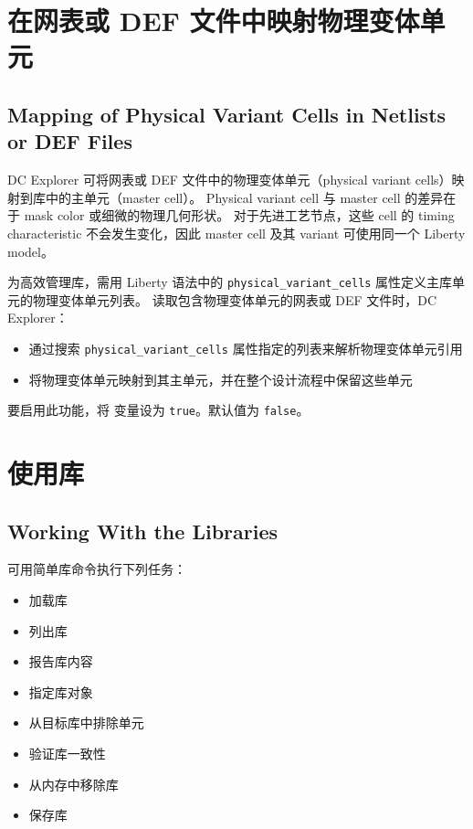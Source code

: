 \section{在网表或 DEF 文件中映射物理变体单元}
\subsection*{Mapping of Physical Variant Cells in Netlists or DEF Files}

DC Explorer 可将网表或 DEF 文件中的物理变体单元（physical variant cells）映射到库中的主单元（master cell）。
Physical variant cell 与 master cell 的差异在于 mask color 或细微的物理几何形状。
对于先进工艺节点，这些 cell 的 timing characteristic 不会发生变化，因此 master cell 及其 variant 可使用同一个 Liberty model。

为高效管理库，需用 Liberty 语法中的 \texttt{physical\_variant\_cells} 属性定义主库单元的物理变体单元列表。
读取包含物理变体单元的网表或 DEF 文件时，DC Explorer：
\begin{itemize}
  \item 通过搜索 \texttt{physical\_variant\_cells} 属性指定的列表来解析物理变体单元引用
  \item 将物理变体单元映射到其主单元，并在整个设计流程中保留这些单元
\end{itemize}

要启用此功能，将  变量设为 \texttt{true}。默认值为 \texttt{false}。

\section{使用库}
\subsection*{Working With the Libraries}

可用简单库命令执行下列任务：
\begin{itemize}
  \item 加载库
  \item 列出库
  \item 报告库内容
  \item 指定库对象
  \item 从目标库中排除单元
  \item 验证库一致性
  \item 从内存中移除库
  \item 保存库
\end{itemize}

